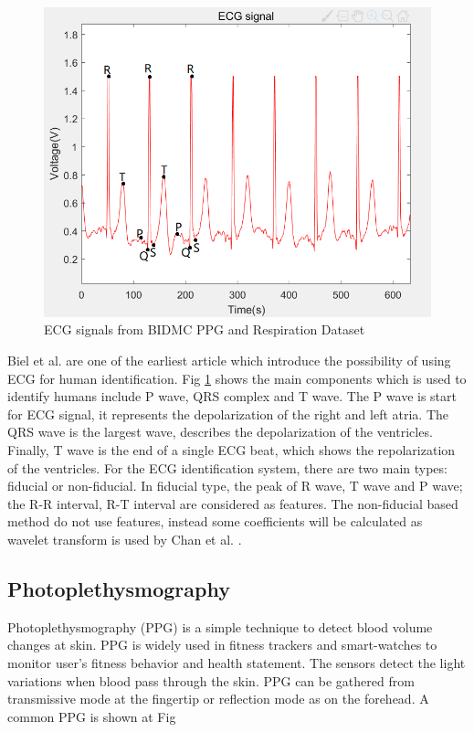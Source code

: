 \documentclass[a4paper,12pt]{article}
\begin{document}
\begin{figure}[H]
\centering
\includegraphics[width = .8\textwidth]{ecg.PNG}
\caption{ECG signals from BIDMC PPG and Respiration Dataset\autocite{PhysioNet}}
\label{fig:ecg}
\end{figure}

Biel et al.\autocite{Biel:2001ecg} are one of the earliest article which introduce the possibility of using ECG for human identification. Fig \ref{fig:ecg} shows the main components which is used to identify humans include P wave, QRS complex and T wave. The P wave is start for ECG signal, it represents the depolarization of the right and left atria\parencite{Agrafioti:2011heart}. The QRS wave is the largest wave, describes the depolarization of the ventricles\parencite{Wiki:ecg}. Finally, T wave is the end of a single ECG beat, which shows the repolarization of the ventricles\parencite{Lilly:2012pathophysiology}. For the ECG identification system, there are two main types: fiducial or non-fiducial\parencite{Agrafioti:2012secure}. In fiducial type, the peak of R wave, T wave and P wave; the R-R interval, R-T interval are considered as features\parencite{Odinaka:2012analysis}. The non-fiducial based method do not use features, instead some coefficients will be calculated as wavelet transform is used by Chan et al. \autocite{Chan2008wavelet}.

\subsection{Photoplethysmography}
Photoplethysmography (PPG) is a simple technique to detect blood volume changes at skin\parencite{Karimian:2017human}. PPG is widely used in fitness trackers and smart-watches to monitor user's fitness behavior and health statement. The sensors detect the light variations when blood pass through the skin\parencite{Blasco:2018feasibility}. PPG can be gathered from transmissive mode at the fingertip or reflection mode as on the forehead\parencite{wiki:ppg}. A common PPG is shown at Fig
\end{document}

